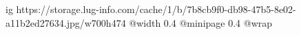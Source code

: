  
 
 
 
 

\ifcmt
  ig https://storage.lug-info.com/cache/1/b/7b8cb9f0-db98-47b5-8e02-a11b2ed27634.jpg/w700h474
  @width 0.4
  @minipage 0.4
  @wrap \parpic[r]
\fi
